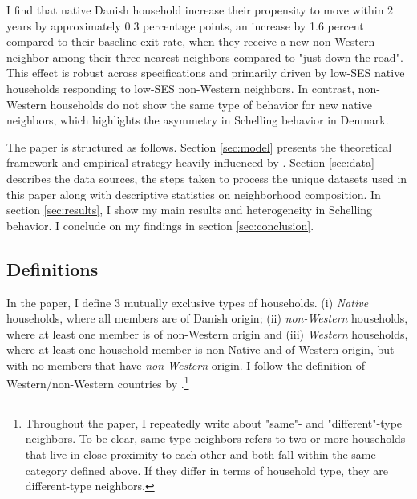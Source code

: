 \documentclass[../main.tex]{subfiles}
\begin{document}
I find that native Danish household increase their propensity to move within 2 years by approximately 0.3 percentage points, an increase by 1.6 percent compared to their baseline exit rate, when they receive a new non-Western neighbor among their three nearest neighbors compared to "just down the road". This effect is robust across specifications and primarily driven by low-SES native households responding to low-SES non-Western neighbors. In contrast, non-Western households do not show the same type of behavior for new native neighbors, which highlights the asymmetry in Schelling behavior in Denmark.  

The paper is structured as follows. Section \ref{sec:model} presents the theoretical framework and empirical strategy heavily influenced by \textcite{Bayer_2022_nearest_neighbor}. Section \ref{sec:data} describes the data sources, the steps taken to process the unique datasets used in this paper along with descriptive statistics on neighborhood composition. In section \ref{sec:results}, I show my main results and heterogeneity in Schelling behavior. I conclude on my findings in section \ref{sec:conclusion}.

\subsection{Definitions}
\label{sec:intro_definitions}
In the paper, I define 3 mutually exclusive types of households. (i) \textit{Native} households, where all members are of Danish origin; (ii) \textit{non-Western} households, where at least one member is of non-Western origin and (iii) \textit{Western} households, where at least one household member is non-Native and of Western origin, but with no members that have \textit{non-Western} origin. I follow the definition of Western/non-Western countries by \textcite{west_non_west_def_dst}.\footnote{Throughout the paper, I repeatedly write about "same"- and "different"-type neighbors. To be clear, same-type neighbors refers to two or more households that live in close proximity to each other and both fall within the same category defined above. If they differ in terms of household type, they are different-type neighbors.}
\end{document}
